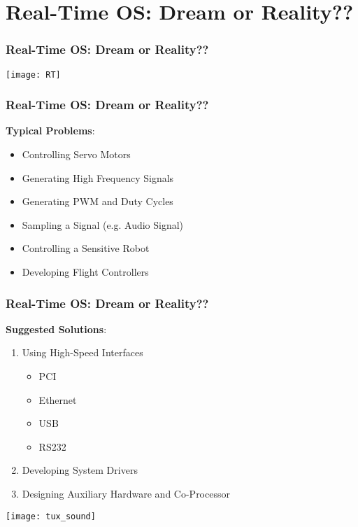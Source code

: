 

\section{Real-Time OS: Dream or Reality??}

\begin{frame}
  \frametitle{Real-Time OS: Dream or Reality??}
  
  \centering
  \texttt{[image: RT]}
  
\end{frame}

\begin{frame}
  \frametitle{Real-Time OS: Dream or Reality??}

    \textbf{Typical Problems}:
    \begin{itemize}
        \item Controlling Servo Motors
        \item Generating High Frequency Signals
        \item Generating PWM and Duty Cycles
        \item Sampling a Signal (e.g. Audio Signal)
        \item Controlling a Sensitive Robot
        \item Developing Flight Controllers
    \end{itemize}


\end{frame}

\begin{frame}
  \frametitle{Real-Time OS: Dream or Reality??}

    \textbf{Suggested Solutions}:
    

    \begin{enumerate}
        \item 
        Using High-Speed Interfaces
            \begin{itemize}
            \item PCI
            \item Ethernet
            \item USB
            \item RS232
        \end{itemize}
        \item Developing System Drivers
        \item Designing Auxiliary Hardware and Co-Processor
    \end{enumerate}    
    
            \centering
  \texttt{[image: tux\_sound]}


\end{frame}